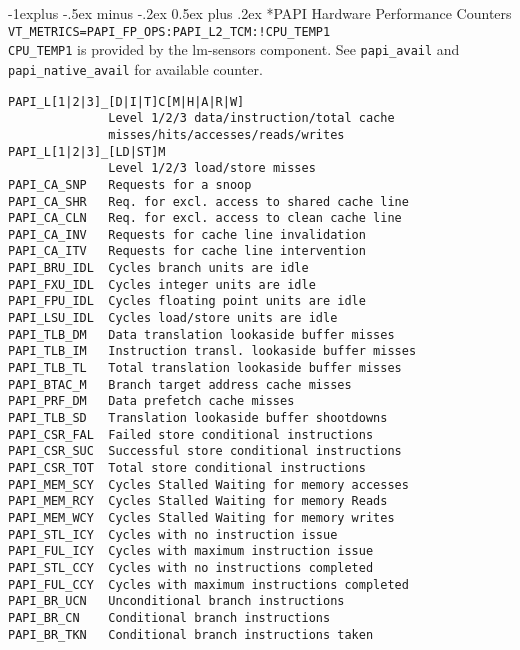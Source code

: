 \documentclass[letterpaper,10pt,landscape]{article}
\makeatletter
\renewcommand{\subsection}{\@startsection{subsection}{2}{0mm}%
                                {-1explus -.5ex minus -.2ex}%
                                {0.5ex plus .2ex}%
                                {\normalfont\normalsize\bfseries}}
\makeatother
\begin{document}
\begin{multicols}{3}
\subsection*{PAPI Hardware Performance Counters}
\verb|VT_METRICS=PAPI_FP_OPS:PAPI_L2_TCM:!CPU_TEMP1|\\
\texttt{CPU\_TEMP1} is provided by the lm-sensors component. See \texttt{papi\_avail} and \texttt{papi\_native\_avail} for available counter.
\begin{scriptsize}
\begin{verbatim}
PAPI_L[1|2|3]_[D|I|T]C[M|H|A|R|W]    
              Level 1/2/3 data/instruction/total cache 
              misses/hits/accesses/reads/writes
PAPI_L[1|2|3]_[LD|ST]M    
              Level 1/2/3 load/store misses                       
PAPI_CA_SNP   Requests for a snoop                                
PAPI_CA_SHR   Req. for excl. access to shared cache line  
PAPI_CA_CLN   Req. for excl. access to clean cache line   
PAPI_CA_INV   Requests for cache line invalidation                
PAPI_CA_ITV   Requests for cache line intervention                
PAPI_BRU_IDL  Cycles branch units are idle                        
PAPI_FXU_IDL  Cycles integer units are idle                       
PAPI_FPU_IDL  Cycles floating point units are idle                
PAPI_LSU_IDL  Cycles load/store units are idle                    
PAPI_TLB_DM   Data translation lookaside buffer misses            
PAPI_TLB_IM   Instruction transl. lookaside buffer misses     
PAPI_TLB_TL   Total translation lookaside buffer misses           
PAPI_BTAC_M   Branch target address cache misses                  
PAPI_PRF_DM   Data prefetch cache misses                          
PAPI_TLB_SD   Translation lookaside buffer shootdowns             
PAPI_CSR_FAL  Failed store conditional instructions               
PAPI_CSR_SUC  Successful store conditional instructions           
PAPI_CSR_TOT  Total store conditional instructions                
PAPI_MEM_SCY  Cycles Stalled Waiting for memory accesses          
PAPI_MEM_RCY  Cycles Stalled Waiting for memory Reads             
PAPI_MEM_WCY  Cycles Stalled Waiting for memory writes            
PAPI_STL_ICY  Cycles with no instruction issue                    
PAPI_FUL_ICY  Cycles with maximum instruction issue               
PAPI_STL_CCY  Cycles with no instructions completed               
PAPI_FUL_CCY  Cycles with maximum instructions completed          
PAPI_BR_UCN   Unconditional branch instructions                   
PAPI_BR_CN    Conditional branch instructions                     
PAPI_BR_TKN   Conditional branch instructions taken               

\end{verbatim}
\end{scriptsize}
\end{multicols}
\end{document}
